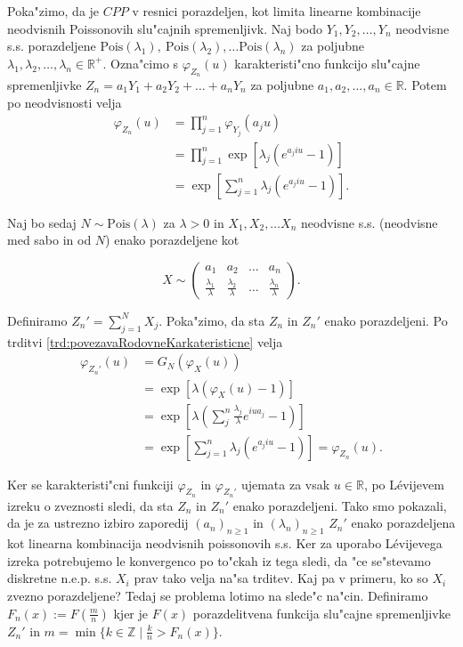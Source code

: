 \documentclass[12pt, a4paper, reqno]{amsart}
\theoremstyle{definition} %
\theoremstyle{plain} %
\newcommand{\R}{\mathbb{R}}
\newcommand{\1}{\mathds{1}}
\newcommand{\Pois}[1]{\text{Pois}(#1)}
\begin{document}
    Poka"zimo, da je $CPP$ v resnici porazdeljen, kot limita linearne 
    kombinacije neodvisnih Poissonovih slu"cajnih spremenljivk. Naj bodo $Y_1, Y_2, \dots, Y_n$
    neodvisne s.s. porazdeljene $\Pois{\lambda_1}, \ \Pois{\lambda_2}, \dots \Pois{\lambda_n}$ za 
    poljubne $\lambda_1, \lambda_2, \dots, \lambda_n \in \R^+$. 
    Ozna"cimo s $\varphi_{Z_n}(u)$ karakteristi"cno funkcijo slu"cajne spremenljivke 
    $Z_n = a_1Y_1 + a_2Y_2 + \dots + a_nY_n$ za poljubne $a_1, a_2, \dots, a_n \in \R$.
    Potem po neodvisnosti velja
    \begin{align*}
        \varphi_{Z_n}(u) 
                &= \prod_{j=1}^{n}\varphi_{Y_j}(a_ju)\\
                &= \prod_{j=1}^{n}\exp\left[\lambda_j\left(e^{a_j i u} - 1\right)\right] \\
                &= \exp\left[\sum_{j=1}^{n}\lambda_j\left(e^{a_j i u} - 1\right)\right].
    \end{align*}

    \noindent
    Naj bo sedaj $N\sim \Pois{\lambda}$  za $\lambda >0$ in $X_1, X_2, \dots X_n$ neodvisne s.s. (neodvisne 
    med sabo in od $N$) enako porazdeljene kot

    $$ X\sim
    \begin{pmatrix}
        a_1 & a_2 &  \dots & a_n \\
        \tfrac{\lambda_1}{\lambda} & \tfrac{\lambda_2}{\lambda} & \dots & \tfrac{\lambda_n}{\lambda}
    \end{pmatrix}.
    $$

    \noindent
    Definiramo $Z_n'=\sum_{j=1}^{N}X_j$. Poka"zimo, da sta $Z_n$ in $Z_n'$ enako porazdeljeni.
    Po trditvi \ref{trd:povezavaRodovneKarkateristicne} velja
    \begin{align*}
        \varphi_{Z_n'}(u) 
                &= G_N\left(\varphi_X(u)\right) \\
                &= \exp\left[\lambda\left(\varphi_X(u) - 1\right)\right] \\
                & = \exp\left[\lambda\left(\sum_j^n\frac{\lambda_j}{\lambda}e^{iua_j} - 1\right)\right]\\
                &= \exp\left[\sum_{j=1}^{n}\lambda_j\left(e^{a_j i u} - 1\right)\right] = \varphi_{Z_n}(u).
    \end{align*}

    \noindent 
    Ker se karakteristi"cni funkciji $\varphi_{Z_n}$ in $\varphi_{Z_n'}$ ujemata za vsak $u\in\R$,
    po Lévijevem izreku o zveznosti sledi, da sta $Z_n$ in $Z_n'$ enako porazdeljeni. Tako smo pokazali, 
    da je za ustrezno izbiro zaporedij $(a_n)_{n\geq1}$ in $(\lambda_n)_{n\geq1}$ $Z_n'$ enako 
    porazdeljena kot linearna kombinacija neodvisnih poissonovih s.s. Ker za uporabo Lévijevega izreka
    potrebujemo le konvergenco po to"ckah iz tega sledi, da "ce se"stevamo diskretne 
    n.e.p. s.s. $X_i$ prav tako velja na"sa trditev. Kaj pa v primeru, ko so $X_i$ zvezno porazdeljene? 
    Tedaj se problema lotimo na slede"c na"cin. Definiramo $F_n(x) := F(\tfrac{m}{n})$ kjer je
    $F(x)$ porazdelitvena funkcija slu"cajne spremenljivke $Z_n'$ in 
    $m = \min\{k \in \mathbb{Z} \mid \tfrac{k}{n} > F_n(x)\}$.
\end{document}
